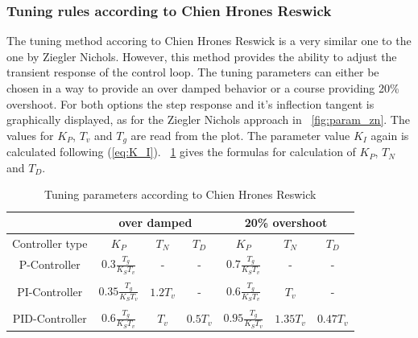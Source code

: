 \subsubsection{Tuning rules according to Chien Hrones Reswick}
The tuning method accoring to Chien Hrones Reswick is a very similar one to the one by Ziegler Nichols. However, this method provides the ability to adjust the transient response of the control loop. The tuning parameters can either be chosen in a way to provide an over damped behavior or a course providing 20\% overshoot.\cite{Reg_11}
For both options the step response and it's inflection tangent is graphically displayed, as for the Ziegler Nichols approach in \figurename~\ref{fig:param_zn}.
The values for $K_{P}$, $T_{v}$ and $T_{g}$ are read from the plot. The parameter value $K_{I}$ again is calculated following (\ref{eq:K_I}). \tablename~\ref{tab:param_chr} gives the formulas for calculation of $K_{P}$,  $T_{N}$ and $T_{D}$.

\begin{table}
  \centering
  \begin{tabular}{c|ccc|ccc}
    \toprule
     & \multicolumn{3}{c|}{over damped} & \multicolumn{3}{c}{20\% overshoot} \\
    \midrule
    Controller type & $K_{P}$ &  $T_{N}$ & $T_{D}$ & $K_{P}$ &  $T_{N}$ & $T_{D}$ \\
    \midrule
    P-Controller & $0.3\frac{T_{g}}{K_{S}T_{v}}$ & - & - & $0.7\frac{T_{g}}{K_{S}T_{v}}$ & - & - \\
    & & & & & & \\
    PI-Controller & $0.35\frac{T_{g}}{K_{S}T_{v}}$ & $1.2T_{v}$ & - & $0.6\frac{T_{g}}{K_{S}T_{v}}$ & $T_{v}$ & - \\
        & & & & & & \\
    PID-Controller & $0.6\frac{T_{g}}{K_{S}T_{v}}$ & $T_{v}$ & $0.5T_{v}$ & $0.95\frac{T_{g}}{K_{S}T_{v}}$ & $1.35T_{v}$ & $0.47T_{v}$\\
    \bottomrule
\end{tabular}
  \caption[Tuning parameters Chien Hrones Reswick]{Tuning parameters according to Chien Hrones Reswick}
  \label{tab:param_chr}
\end{table}

